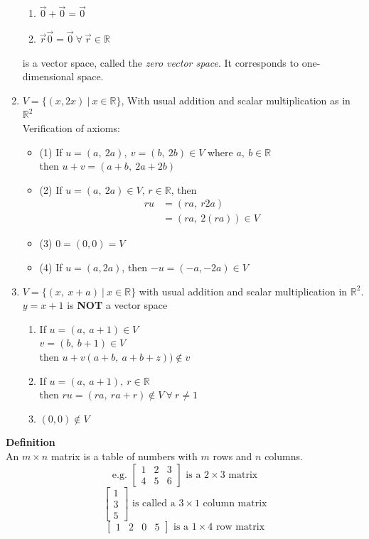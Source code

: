 \documentclass[]{article}
\begin{document}
\begin{enumerate}
\begin{enumerate}
				\item $\vec{0}+\vec{0}=\vec{0}$
				\item $\vec{r}\vec{0}=\vec{0}~\forall~\vec{r}\in\mathbb{R}$
			\end{enumerate}
			is a vector space, called the \emph{zero vector space}. It corresponds to one-dimensional space.
			\item $V=\{ (x,2x)~|~x\in\mathbb{R} \}$, With usual addition and scalar multiplication as in $\mathbb{R}^2$\\
			Verification of axioms:
			\begin{itemize}
				\item (1) If $u=(a,~2a),~v=(b,~2b)\in V$ where $a,~b\in\mathbb{R}$\\
				then $u+v=(a+b,~2a+2b)$
				\item (2) If $u=(a,~2a)\in V$, $r\in\mathbb{R}$, then
				\begin{align*}
					ru&=(ra,~r2a)\\
					&=(ra,~2(ra))\in V
				\end{align*}
				\item (3) $0=(0,0)=V$
				\item (4) If $u=(a,2a)$, then $-u=(-a,-2a)\in V$
			\end{itemize}
			\item $V=\{(x,~x+a)~|~x\in\mathbb{R}\}$ with usual addition and scalar multiplication in $\mathbb{R}^2$.\\
			$y=x+1$ is {\bf NOT} a vector space
			\begin{enumerate}
				\item If $u=(a,~a+1)\in V$\\
				$v=(b,~b+1)\in V$\\
				then $u+v(a+b,~a+b+z))\notin v$
				\item If $u=(a,~a+1),~r\in\mathbb{R}$\\
				then $ru=(ra,~ra+r)\notin V~\forall~r\ne 1$
				\item $(0,0)\notin V$
			\end{enumerate}
		\end{enumerate}
		\vspace{5 mm}
		\large{\bf Definition}\\
		\normalsize An $m\times n$ matrix is a table of numbers with $m$ rows and $n$ columns.
		$$
		\text{e.g. }
			\begin{bmatrix}
				{1} & {2} & {3}\\
				{4} & {5} & {6}
			\end{bmatrix}
			\text{ is a }2\times 3\text{ matrix}
		$$$$
			\begin{bmatrix}
				{1}\\
				{3}\\
				{5}
			\end{bmatrix}\text{ is called a }3\times 1\text{ column matrix}
		$$$$
			\begin{bmatrix}
				{1} & {2} & {0} & {5}
			\end{bmatrix}\text{ is a }1\times 4\text{ row matrix}
		$$
\end{document}

